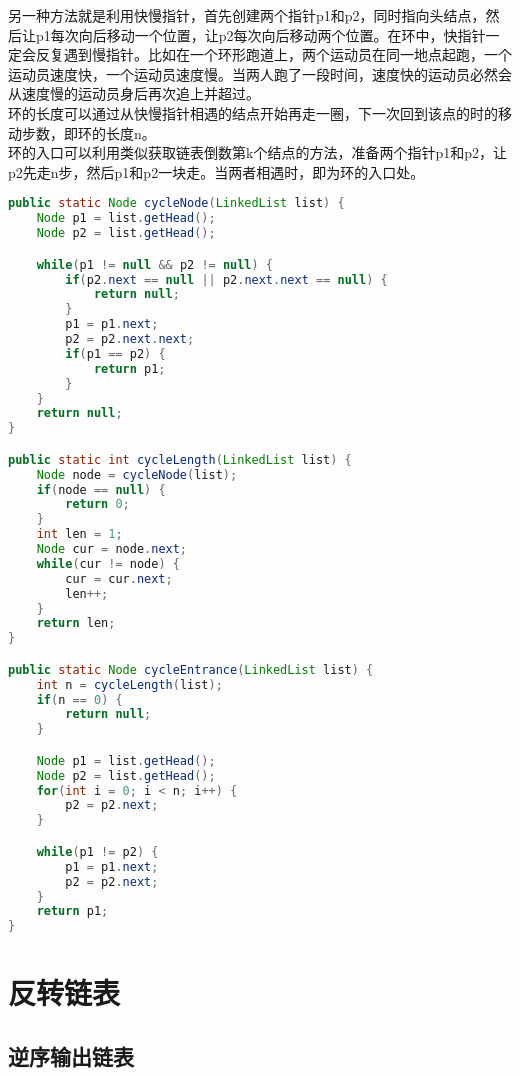 另一种方法就是利用快慢指针，首先创建两个指针p1和p2，同时指向头结点，然后让p1每次向后移动一个位置，让p2每次向后移动两个位置。在环中，快指针一定会反复遇到慢指针。比如在一个环形跑道上，两个运动员在同一地点起跑，一个运动员速度快，一个运动员速度慢。当两人跑了一段时间，速度快的运动员必然会从速度慢的运动员身后再次追上并超过。 \\

环的长度可以通过从快慢指针相遇的结点开始再走一圈，下一次回到该点的时的移动步数，即环的长度n。 \\

环的入口可以利用类似获取链表倒数第k个结点的方法，准备两个指针p1和p2，让p2先走n步，然后p1和p2一块走。当两者相遇时，即为环的入口处。 \\


\begin{lstlisting}[language=Java]
public static Node cycleNode(LinkedList list) {
    Node p1 = list.getHead();
    Node p2 = list.getHead();

    while(p1 != null && p2 != null) {
        if(p2.next == null || p2.next.next == null) {
            return null;
        }
        p1 = p1.next;
        p2 = p2.next.next;
        if(p1 == p2) {
            return p1;
        }
    }
    return null;
}

public static int cycleLength(LinkedList list) {
    Node node = cycleNode(list);
    if(node == null) {
        return 0;
    }
    int len = 1;
    Node cur = node.next;
    while(cur != node) {
        cur = cur.next;
        len++;
    }
    return len;
}

public static Node cycleEntrance(LinkedList list) {
    int n = cycleLength(list);
    if(n == 0) {
        return null;
    }

    Node p1 = list.getHead();
    Node p2 = list.getHead();
    for(int i = 0; i < n; i++) {
        p2 = p2.next;
    }

    while(p1 != p2) {
        p1 = p1.next;
        p2 = p2.next;
    }
    return p1;
}
\end{lstlisting}

\newpage

\section{反转链表}

\subsection{逆序输出链表}

